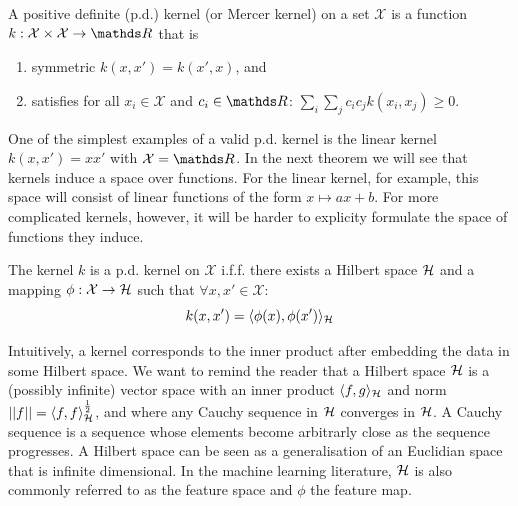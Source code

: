 \begin{definition}
A positive definite (p.d.) kernel (or Mercer kernel) on a set $\mathcal{X}$ is a function $k: \mathcal{X} \times \mathcal{X} \rightarrow \Reals$ that is
\begin{enumerate}
  \item symmetric $k(x, x') = k(x', x)$, and
  \item satisfies for all $x_i \in \mathcal{X}$ and $c_i \in \Reals$: $\sum_{i}\sum_j c_i c_j k(x_i, x_j)\ge 0$.
\end{enumerate}
\end{definition}
One of the simplest examples of a valid p.d. kernel is the linear kernel $k(x, x') = xx'$ with $\mathcal{X} = \Reals$. In the next theorem we will see that kernels induce a space over functions. For the linear kernel, for example, this space will consist of linear functions of the form $x \mapsto a x + b$. For more complicated kernels, however, it will be harder to explicity formulate the space of functions they induce.
\begin{theorem}
  \label{theorem:k-and-H}
  The kernel $k$ is a p.d. kernel on $\mathcal{X}$ i.f.f. there exists a Hilbert space ${\mathcal{H}}$ and a mapping $\phi: \mathcal{X} \rightarrow {\mathcal{H}}$ such that $\forall x,x' \in \mathcal{X}$:
  \begin{equation}
    k(x, x') = \langle \phi(x), \phi(x') \rangle_{{\mathcal{H}}}
  \end{equation}
\end{theorem}
Intuitively, a kernel corresponds to the inner product after embedding the data in some Hilbert space. We want to remind the reader that a Hilbert space ${\mathcal{H}}$ is a (possibly infinite) vector space with an inner product $\langle f, g \rangle_{{\mathcal{H}}}$ and norm $\lvert\lvert f\rvert\rvert = \langle f, f \rangle_{{\mathcal{H}}}^{\frac{1}{2}}$, and where any Cauchy sequence in ${\mathcal{H}}$ converges in ${\mathcal{H}}$. A Cauchy sequence is a sequence whose elements become arbitrarly close as the sequence progresses. A Hilbert space can be seen as a generalisation of an Euclidian space that is infinite dimensional. In the machine learning literature, ${\mathcal{H}}$ is also commonly referred to as the feature space and $\phi$ the feature map.

